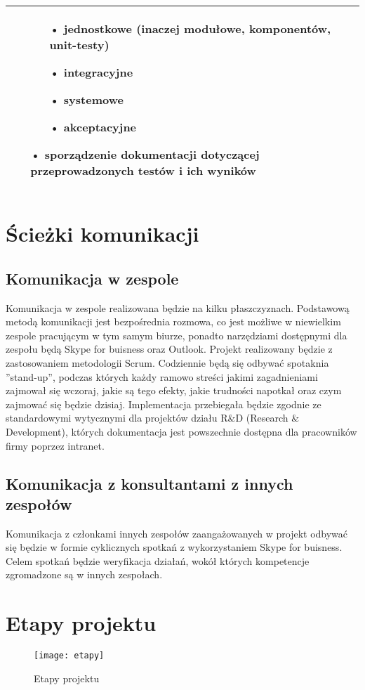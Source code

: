 \begin{center}
\begin{longtable}{ | l | p{5cm} | p{5cm} |}
\begin{itemize}
	\begin{itemize}
	\item[•] jednostkowe (inaczej modułowe, komponentów, unit-testy)
	\item[•] integracyjne
	\item[•] systemowe
	\item[•] akceptacyjne
	\end{itemize}
	\item[•] sporządzenie dokumentacji dotyczącej przeprowadzonych testów i ich wyników
	\end{itemize}
	\\ \hline
    \hline
    \end{longtable}
\end{center}

\chapter{Ścieżki komunikacji}
\section{Komunikacja w zespole}
Komunikacja w zespole realizowana będzie na kilku płaszczyznach. Podstawową metodą komunikacji jest bezpośrednia rozmowa, co jest możliwe w niewielkim zespole pracującym w tym samym biurze, ponadto narzędziami dostępnymi dla zespołu będą Skype for buisness oraz Outlook. Projekt realizowany będzie z zastosowaniem metodologii Scrum. Codziennie będą się odbywać spotaknia ''stand-up'', podczas których każdy ramowo streści jakimi zagadnieniami zajmował się wczoraj, jakie są tego efekty, jakie trudności napotkał oraz czym zajmować się będzie dzisiaj. Implementacja przebiegała będzie zgodnie ze standardowymi wytycznymi dla projektów działu R$\&$D (Research $\&$ Development), których dokumentacja jest powszechnie dostępna dla pracowników firmy poprzez intranet.
\section{Komunikacja z konsultantami z innych zespołów}
Komunikacja z członkami innych zespołów zaangażowanych w projekt odbywać się będzie w formie cyklicznych spotkań z wykorzystaniem Skype for buisness. Celem spotkań będzie weryfikacja działań, wokół których kompetencje zgromadzone są w innych zespołach.
\chapter{Etapy projektu}
\begin{figure}[H]
\centering
  \texttt{[image: etapy]}
  \caption{Etapy projektu}
  \label{etapy}
\end{figure}

